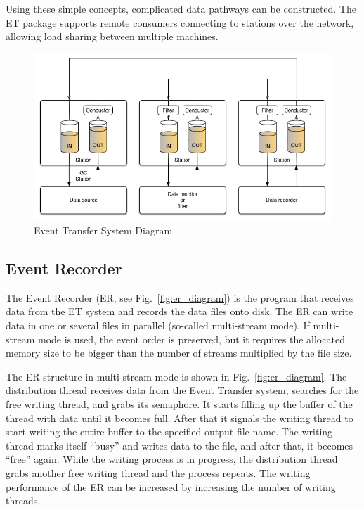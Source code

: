 Using these simple concepts, complicated data pathways can be constructed. The ET package supports remote consumers connecting to stations over the network, allowing load sharing between multiple machines. 

\begin{figure}[hbt]
	\centering
	\includegraphics[width=1.0\columnwidth,keepaspectratio]{img/et_diagram.png}
	\caption{Event Transfer System Diagram}
	\label{fig:et_diagram}
\end{figure}

\subsection{Event Recorder}

The Event Recorder (ER, see Fig.~\ref{fig:er_diagram}) is the program that receives data from the ET system and records the data files onto disk. The ER can write data in one or several files in parallel (so-called multi-stream mode). If multi-stream mode is used, the event order is preserved, but it requires the allocated memory size to be bigger than the number of streams multiplied by the file size.

The ER structure in multi-stream mode is shown in Fig.~\ref{fig:er_diagram}. The distribution thread receives data from the Event Transfer system, searches for the free writing thread, and grabs its semaphore. It starts filling up the buffer of the thread with data until it becomes full. After that it signals the writing thread to start writing the entire buffer to the specified output file name. The writing thread marks itself ``busy'' and writes data to the file, and after that, it becomes ``free'' again. While the writing process is in progress, the distribution thread grabs another free writing thread and the process repeats. The writing performance of the ER can be increased by increasing the number of writing threads.

